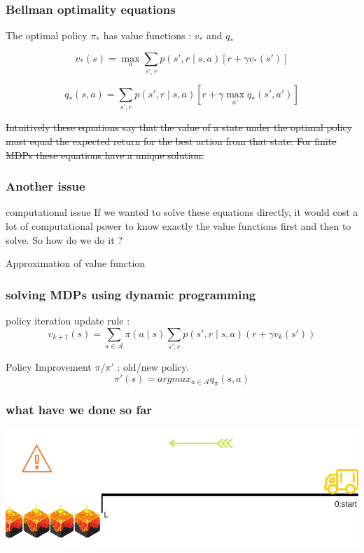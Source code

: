 \documentclass[dvipsnames,svgnames]{beamer}
\begin{document}
\begin{frame}
\frametitle{Bellman optimality equations}

The optimal policy $\pi_{*}$ has value functions : $v_*$ and $q_*$

\begin{block}{}

\begin{equation}
v_{*}(s)=\max_{a} \sum_{s',r}p(s',r\mid s,a)[r+\gamma v_{*}(s')]
\label{bellman_opt_v}
\end{equation}

\begin{equation}
q_{*}(s,a)= \sum_{s',r}p(s',r \mid s,a)[r+\gamma \max_{a'}q_{*}(s',a')]
\label{bellman_opt_q}
\end{equation}
\end{block}

\sout{Intuitively these equations say that the value of a state under the optimal policy must equal the expected return for the best action from that state. For finite MDPs these equations have a unique solution.}
\end{frame}

\begin{frame}
\frametitle{Another issue}
\begin{alertblock}{computational issue}
If we wanted to solve these equations directly, it would cost a lot of computational power to know exactly the value functions first and then to solve. So how do we do it ? 
\end{alertblock}

\pause 
\vspace{1cm}
\centering
Approximation of value function

\end{frame}

\begin{frame}
\frametitle{solving MDPs using dynamic programming}
\begin{block}{policy iteration}
update rule : 
$$ v_{k+1}(s)=\sum_{a \in \mathcal{A}}\pi(a \mid s)\sum_{s',r}p(s',r\mid s,a)(r+\gamma v_k(s')) $$
\end{block}
\begin{block}{Policy Improvement}
$\pi/\pi'$ : old/new policy.
$$\pi'(s) = argmax_{a \in \mathcal{A}}q_{\pi}(s,a) $$
\end{block}

\end{frame}


\begin{frame}
\frametitle{what have we done so far}
\begin{center}
\includegraphics[scale=0.4]{illustration.png}
\end{center}
\end{frame}
\end{document}
